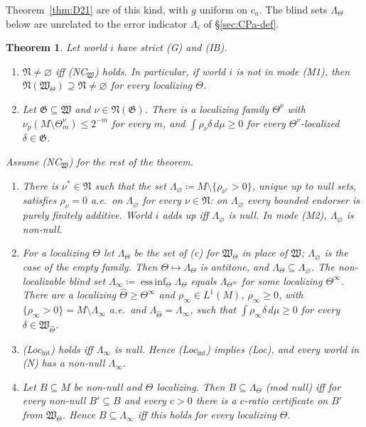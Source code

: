 \documentclass[11pt]{article}
\newtheorem{theorem}{Theorem}[section]
\theoremstyle{definition}
\theoremstyle{remark}
\begin{document}
Theorem~\ref{thm:D21} are of this kind, with $g$ uniform on $c_a$. The blind sets $\Lambda_\Theta$ below are unrelated to the error indicator $\Lambda_i$ of \S\ref{sec:CPa-def}.

\begin{theorem}\label{thm:K31}
Let world $i$ have strict (G) and (IB).
\begin{enumerate}[leftmargin=*,label=(\alph*)]
\item $\mathfrak N\ne\varnothing$ iff (NC$_{\mathfrak W}$) holds. In particular, if world $i$ is not in mode (M1), then $\mathfrak N(\mathfrak W_\Theta)\supseteq\mathfrak N\ne\varnothing$ for every localizing $\Theta$.
\item Let $\mathfrak G\subseteq\mathfrak W$ and $\nu\in\mathfrak N(\mathfrak G)$. There is a localizing family $\Theta^\nu$ with $\nu_p(M\setminus\Theta^\nu_m)\le2^{-m}$ for every $m$, and $\int\rho_\nu\delta\,d\mu\ge0$ for every $\Theta^\nu$-localized $\delta\in\mathfrak G$.
\end{enumerate}
Assume (NC$_{\mathfrak W}$) for the rest of the theorem.
\begin{enumerate}[leftmargin=*,label=(\alph*),resume]
\item There is $\nu^*\in\mathfrak N$ such that the set $\Lambda_\varnothing\coloneqq M\setminus\{\rho_{\nu^*}>0\}$, unique up to null sets, satisfies $\rho_\nu=0$ a.e.\ on $\Lambda_\varnothing$ for every $\nu\in\mathfrak N$: on $\Lambda_\varnothing$ every bounded endorser is purely finitely additive. World $i$ adds up iff $\Lambda_\varnothing$ is null. In mode (M2), $\Lambda_\varnothing$ is non-null.
\item For a localizing $\Theta$ let $\Lambda_\Theta$ be the set of (c) for $\mathfrak W_\Theta$ in place of $\mathfrak W$; $\Lambda_\varnothing$ is the case of the empty family. Then $\Theta\mapsto\Lambda_\Theta$ is antitone, and $\Lambda_\Theta\subseteq\Lambda_\varnothing$. The \emph{non-localizable blind set} $\Lambda_\infty\coloneqq\operatorname*{ess\,inf}_\Theta\Lambda_\Theta$ equals $\Lambda_{\Theta^\infty}$ for some localizing $\Theta^\infty$. There are a localizing $\hat\Theta\ge\Theta^\infty$ and $\rho_\infty\in L^1(M)$, $\rho_\infty\ge0$, with $\{\rho_\infty>0\}=M\setminus\Lambda_\infty$ a.e.\ and $\Lambda_{\hat\Theta}=\Lambda_\infty$, such that $\int\rho_\infty\delta\,d\mu\ge0$ for every $\delta\in\mathfrak W_{\hat\Theta}$.
\item (Loc$_{\mathrm{int}}$) holds iff $\Lambda_\infty$ is null. Hence (Loc$_{\mathrm{int}}$) implies (Loc), and every world in (N) has a non-null $\Lambda_\infty$.
\item Let $B\subseteq M$ be non-null and $\Theta$ localizing. Then $B\subseteq\Lambda_\Theta$ (mod null) iff for every non-null $B'\subseteq B$ and every $c>0$ there is a $c$-ratio certificate on $B'$ from $\mathfrak W_\Theta$. Hence $B\subseteq\Lambda_\infty$ iff this holds for every localizing $\Theta$.
\end{enumerate}
\end{theorem}
\end{document}
